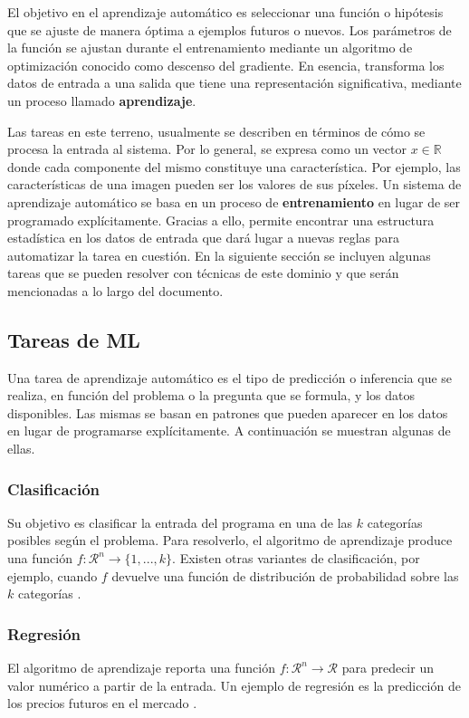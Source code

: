 El objetivo en el aprendizaje automático es seleccionar una función o hipótesis que se ajuste de manera óptima a ejemplos futuros o nuevos. Los parámetros de la función se ajustan durante el entrenamiento mediante un algoritmo de optimización conocido como descenso del gradiente. En esencia, transforma los datos de entrada a una salida que tiene una representación significativa, mediante un proceso llamado \textbf{aprendizaje}. 

Las tareas en este terreno, usualmente se describen en términos de cómo se procesa la entrada al sistema. Por lo general, se expresa como un vector $x \in \mathbb{R}$ donde cada componente del mismo constituye una característica. Por ejemplo, las características de una imagen pueden ser los valores de sus píxeles. Un sistema de aprendizaje automático se basa en un proceso de \textbf{entrenamiento} en lugar de ser programado explícitamente. Gracias a ello, permite encontrar una estructura estadística en los datos de entrada que dará lugar a nuevas reglas para automatizar la tarea en cuestión. En la siguiente sección se incluyen algunas tareas que se pueden resolver con técnicas de este dominio y que serán mencionadas a lo largo del documento. 

\subsection{Tareas de ML}\label{1-MLtareas}

Una tarea de aprendizaje automático es el tipo de predicción o inferencia que se realiza, en función del problema o la pregunta que se formula, y los datos disponibles. Las mismas se basan en patrones que pueden aparecer en los datos en lugar de programarse explícitamente. A continuación se muestran algunas de ellas.

\subsubsection{Clasificación}\label{1-Clasif}
 Su objetivo es clasificar la entrada del programa en una de las $k$ categorías posibles según el problema. Para resolverlo, el algoritmo de aprendizaje produce una función $f:\mathcal{R}^n \rightarrow \{1, ..., k\}$. Existen otras variantes de clasificación, por ejemplo, cuando $f$ devuelve una función de distribución de probabilidad sobre las $k$ categorías \cite{BengioGood}.
 
 \subsubsection{Regresión}\label{1-Regres}
 El algoritmo de aprendizaje reporta una función $f: \mathcal{R}^n \rightarrow \mathcal{R}$ para predecir un valor numérico a partir de la entrada. Un ejemplo de regresión es la predicción de los precios futuros en el mercado \cite{BengioGood}.

